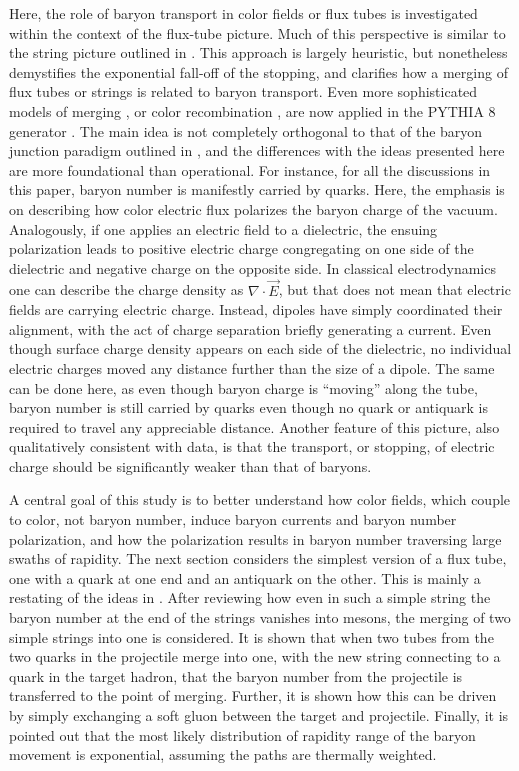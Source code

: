 \documentclass[aps, prc, 12pt, nofootinbib, showpacs, superscriptaddress, tightenlines, groupedaddress]{revtex4-2}
\begin{document}
Here, the role of baryon transport in color fields or flux tubes is investigated within the context of the flux-tube picture. Much of this perspective is similar to the string picture outlined in \cite{Vance:1997th}. This approach is largely heuristic, but nonetheless demystifies the exponential fall-off of the stopping, and clarifies how a merging of flux tubes or strings is related to baryon transport. Even more sophisticated models of merging \cite{Sjostrand:2004pf}, or color recombination \cite{Christiansen:2015yqa}, are now applied in the PYTHIA 8 generator \cite{Bierlich:2022pfr}. The main idea is not completely orthogonal to that of the baryon junction paradigm outlined in \cite{Kharzeev:1996sq}, and the differences with the ideas presented here are more foundational than operational. For instance, for all the discussions in this paper, baryon number is manifestly carried by quarks. Here, the emphasis is on describing how color electric flux polarizes the baryon charge of the vacuum. Analogously, if one applies an electric field to a dielectric, the ensuing polarization leads to positive electric charge congregating on one side of the dielectric and negative charge on the opposite side. In classical electrodynamics one can describe the charge density as $\nabla\cdot\vec{E}$, but that does not mean that electric fields are carrying electric charge. Instead, dipoles have simply coordinated their alignment, with the act of charge separation briefly generating a current. Even though surface charge density appears on each side of the dielectric, no individual electric charges moved any distance further than the size of a dipole. The same can be done here, as even though baryon charge is ``moving'' along the tube, baryon number is still carried by quarks even though no quark or antiquark is required to travel any appreciable distance. Another feature of this picture, also qualitatively consistent with data, is that the transport, or stopping, of electric charge should be significantly weaker than that of baryons.

A central goal of this study is to better understand how color fields, which couple to color, not baryon number, induce baryon currents and baryon number polarization, and how the polarization results in baryon number traversing large swaths of rapidity. The next section considers the simplest version of a flux tube, one with a quark at one end and an antiquark on the other. This is mainly a restating of the ideas in \cite{Vance:1997th}. After reviewing how even in such a simple string the baryon number at the end of the strings vanishes into mesons, the merging of two simple strings into one is considered. It is shown that when two tubes from the two quarks in the projectile merge into one, with the new string connecting to a quark in the target hadron, that the baryon number from the projectile is transferred to the point of merging. Further, it is shown how this can be driven by simply exchanging a soft gluon between the target and projectile. Finally, it is pointed out that the most likely distribution of rapidity range of the baryon movement is exponential, assuming the paths are thermally weighted.
\end{document}
